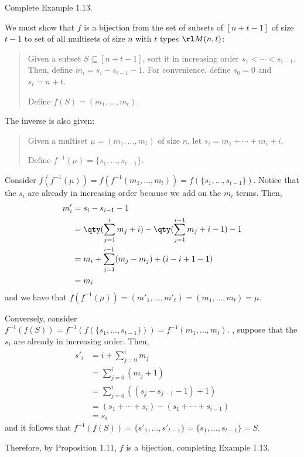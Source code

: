 \begin{xca}
  Complete Example 1.13.
\end{xca}
\begin{prf}
  We must show that $f$ is a bijection from
  the set of subsets of $[n+t-1]$ of size $t-1$
  to set of all multisets of size $n$ with $t$ types $\rl M(n,t)$:
  \begin{quote}
    Given a subset $S \subseteq [n+t-1]$,
    sort it in increasing order $s_1 < \dotsb < s_{t-1}$.
    Then, define $m_i = s_i - s_{i-1} - 1$.
    For convenience, define $s_0 = 0$ and $s_t = n+t$.

    Define $f(S) = (m_1,\dotsc,m_t)$.
  \end{quote}
  The inverse is also given:
  \begin{quote}
    Given a multiset $\mu = (m_1,\dotsc,m_t)$ of size $n$,
    let $s_i = m_1 + \dotsb + m_i + i$.

    Define $f^{-1}(\mu) = \{s_1,\dotsc,s_{t-1}\}$.
  \end{quote}
  Consider $f(f^{-1}(\mu)) = f(f^{-1}(m_1,\dotsc,m_t)) = f(\{s_1,\dotsc,s_{t-1}\})$.
  Notice that the $s_i$ are already in increasing order
  because we add on the $m_i$ terms. Then,
  \begin{align*}
    m'_i & = s_i - s_{i-1} - 1                                                 \\
         & = \qty(\sum_{j=1}^i m_j + i) - \qty(\sum_{j=1}^{i-1} m_j + i-1) - 1 \\
         & = m_i + \sum_{j=1}^{i-1}(m_j - m_j) + (i - i + 1 - 1)               \\
         & = m_i
  \end{align*}
  and we have that $f(f^{-1}(\mu)) = (m'_1,\dotsc,m'_t) = (m_1,\dotsc,m_t) = \mu$.

  Conversely, consider $f^{-1}(f(S)) = f^{-1}(f(\{s_1,\dotsc,s_{t-1}\})) = f^{-1}(m_1,\dotsc,m_t)$.
  \WLOG, suppose that the $s_i$ are already in increasing order. Then,
  \begin{align*}
    s'_i & = i + \sum_{j=0}^i m_j                            \\
         & = \sum_{j=0}^i (m_j + 1)                          \\
         & = \sum_{j=0}^i ((s_j - s_{j-1} - 1) + 1)          \\
         & = (s_1 + \dotsb + s_i) - (s_1 + \dotsb + s_{i-1}) \\
         & = s_i
  \end{align*}
  and it follows that $f^{-1}(f(S)) = \{s'_1,\dotsc,s'_{t-1}\} = \{s_1,\dotsc,s_{t-1}\} = S$.

  Therefore, by Proposition 1.11, $f$ is a bijection, completing Example 1.13.
\end{prf}

